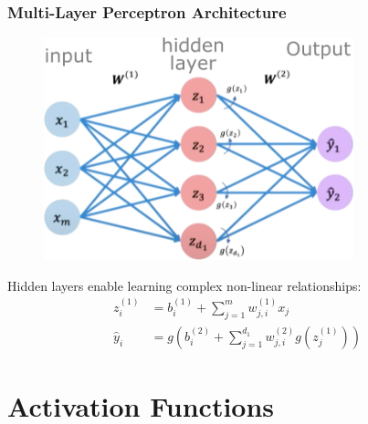 \documentclass{beamer}
\begin{document}
\begin{frame}
\frametitle{Multi-Layer Perceptron Architecture}
\begin{figure}
\includegraphics[width=0.8\textwidth]{single-layer-nn2.png}
\end{figure}

Hidden layers enable learning complex non-linear relationships:
\begin{align}
z_i^{(1)} &= b_i^{(1)} + \sum_{j=1}^{m} w_{j,i}^{(1)} x_j \\
\hat{y}_i &= g\left(b_i^{(2)} + \sum_{j=1}^{d_1} w_{j,i}^{(2)} g(z_j^{(1)})\right)
\end{align}
\end{frame}

\section{Activation Functions}
\end{document}
